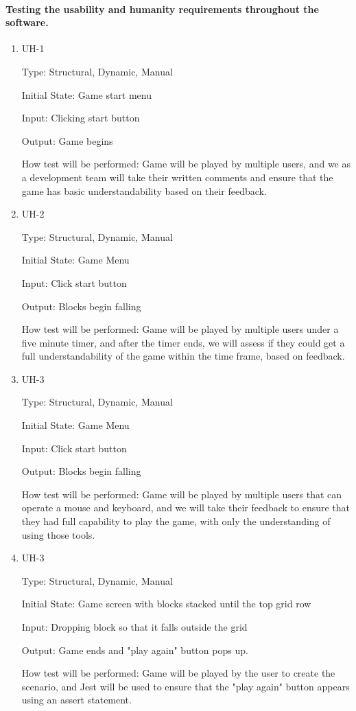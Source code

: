 \documentclass[12pt, titlepage]{article}
\begin{document}
\paragraph{Testing the usability and humanity requirements throughout the software.}
\begin{enumerate}

\item{UH-1\\}

Type: Structural, Dynamic, Manual
					
Initial State: Game start menu
					
Input: Clicking start button 
					
Output: Game begins
					
How test will be performed: Game will be played by multiple users, and we as a development team will take their written comments and ensure that the game has basic understandability based on their feedback. 

\item{UH-2\\}

Type: Structural, Dynamic, Manual
					
Initial State: Game Menu 
					
Input: Click start button 
					
Output: Blocks begin falling
					
How test will be performed: Game will be played by multiple users under a five minute timer, and after the timer ends, we will assess if they could get a full understandability of the game within the time frame, based on feedback. 

\item{UH-3\\}

Type: Structural, Dynamic, Manual
					
Initial State: Game Menu 
					
Input: Click start button 
					
Output: Blocks begin falling
					
How test will be performed: Game will be played by multiple users that can operate a mouse and keyboard, and we will take their feedback to ensure that they had full capability to play the game, with only the understanding of using those tools. 

\item{UH-3\\}

Type: Structural, Dynamic, Manual
					
Initial State: Game screen with blocks stacked until the top grid row
					
Input: Dropping block so that it falls outside the grid
					
Output: Game ends and "play again" button pops up.
					
How test will be performed: Game will be played by the user to create the scenario, and Jest will be used to ensure that the "play again" button appears using an assert statement. 

\end{enumerate}
\end{document}
